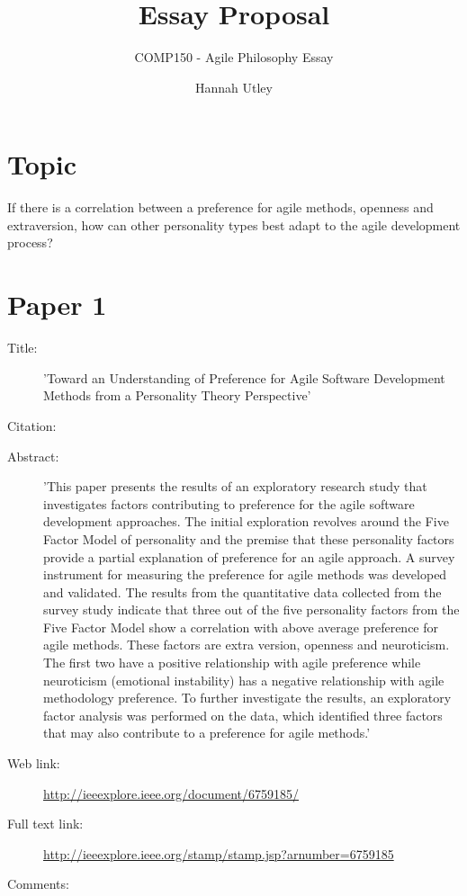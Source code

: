 \documentclass{scrartcl}
\title{Essay Proposal}
\subtitle{COMP150 - Agile Philosophy Essay}
\author{Hannah Utley}
\begin{document}
\maketitle

\section*{Topic}

If there is a correlation between a preference for agile methods, openness and extraversion, how can other personality types best adapt to the agile development process?

\section*{Paper 1}
\begin{description}
\item[Title:] 'Toward an Understanding of Preference for Agile Software Development Methods from a Personality Theory Perspective'
\item[Citation:] \cite{Paper1}
\item[Abstract:] 'This paper presents the results of an exploratory research study that investigates factors contributing to preference for the agile software development approaches. The initial exploration revolves around the Five Factor Model of personality and the premise that these personality factors provide a partial explanation of preference for an agile approach. A survey instrument for measuring the preference for agile methods was developed and validated. The results from the quantitative data collected from the survey study indicate that three out of the five personality factors from the Five Factor Model show a correlation with above average preference for agile methods. These factors are extra version, openness and neuroticism. The first two have a positive relationship with agile preference while neuroticism (emotional instability) has a negative relationship with agile methodology preference. To further investigate the results, an exploratory factor analysis was performed on the data, which identified three factors that may also contribute to a preference for agile methods.'
\item[Web link:] \url{http://ieeexplore.ieee.org/document/6759185/}
\item[Full text link:] \url{http://ieeexplore.ieee.org/stamp/stamp.jsp?arnumber=6759185}
\item[Comments:] 
\end{description}
\end{document}
